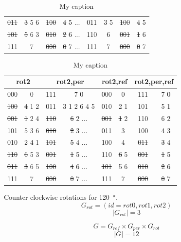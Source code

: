 \documentclass{ijuc}
\begin{document}
\begin{table}
\begin{center}
\begin{tabular}{cc|cc|cc|cc}
\sout{011} & \sout{3} 5 6 & \sout{100} & \sout{4} 5 ...     &       011  &       3  5       & \sout{100} & \sout{4} 5          \\
\sout{101} & \sout{5} 6 3 & \sout{010} & \sout{2} 6 ...     &       110  &       6          & \sout{001} & \sout{1} 6          \\
      111  &       7      & \sout{000} & \sout{0} 7 ...     &       111  &       7          & \sout{000} & \sout{0} 7          \\
\end{tabular}
\begin{tabular}{cc|cc|cc|cc}
\multicolumn{2}{c|}{rot2} & \multicolumn{2}{c|}{rot2,per} & \multicolumn{2}{c|}{rot2,ref} & \multicolumn{2}{c}{rot2,per,ref} \\ \hline
      000  &       0      &       111  &       7  0         &       000  &       0          &       111  &       7  0          \\
\sout{100} & \sout{4} 1 2 &       011  &       3  1 2 6 4 5 &       010  &       2  1       &       101  &       5  1          \\
\sout{001} & \sout{1} 2 4 & \sout{110} & \sout{6} 2 ...     & \sout{001} & \sout{1} 2       &       110  &       6  2          \\
      101  &       5  3 6 & \sout{010} & \sout{2} 3 ...     &       011  &       3          &       100  &       4  3          \\
      010  &       2  4 1 & \sout{101} & \sout{5} 4 ...     &       100  &       4          & \sout{011} & \sout{3} 4          \\
\sout{110} & \sout{6} 5 3 & \sout{001} & \sout{1} 5 ...     &       110  & \sout{6} 5       & \sout{001} & \sout{1} 5          \\
\sout{011} & \sout{3} 6 5 & \sout{100} & \sout{4} 6 ...     & \sout{101} &       5  6       & \sout{010} & \sout{2} 6          \\
      111  &       7      & \sout{000} & \sout{0} 7 ...     &       111  &       7          & \sout{000} & \sout{0} 7          \\
\end{tabular}
\end{center}
\caption{My caption}
\label{tbl-trid}
\end{table}

Counter clockwise rotations for \SI{120}{\degree}.
\[ G_{rot} = (id=rot0, rot1, rot2) \]
\[ \vert G_{rot} \vert = 3 \]

\[ G = G_{ref} \times G_{per} \times G_{rot} \]
\[ \vert G \vert = 12 \]
\end{document}
